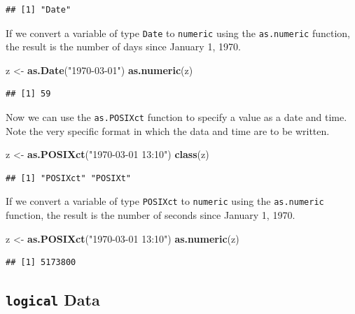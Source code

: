 \documentclass[]{book}
\newenvironment{Shaded}{\begin{snugshade}}{\end{snugshade}}
\newcommand{\KeywordTok}[1]{\textcolor[rgb]{0.13,0.29,0.53}{\textbf{#1}}}
\newcommand{\StringTok}[1]{\textcolor[rgb]{0.31,0.60,0.02}{#1}}
\newcommand{\NormalTok}[1]{#1}
\begin{document}
\begin{verbatim}
## [1] "Date"
\end{verbatim}

If we convert a variable of type \texttt{Date} to \texttt{numeric} using
the \texttt{as.numeric} function, the result is the number of days since
January 1, 1970.

\begin{Shaded}
\begin{Highlighting}[]
\NormalTok{z <-}\StringTok{ }\KeywordTok{as.Date}\NormalTok{(}\StringTok{"1970-03-01"}\NormalTok{)}
\KeywordTok{as.numeric}\NormalTok{(z)}
\end{Highlighting}
\end{Shaded}

\begin{verbatim}
## [1] 59
\end{verbatim}

Now we can use the \texttt{as.POSIXct} function to specify a value as a
date and time. Note the very specific format in which the data and time
are to be written.

\begin{Shaded}
\begin{Highlighting}[]
\NormalTok{z <-}\StringTok{ }\KeywordTok{as.POSIXct}\NormalTok{(}\StringTok{"1970-03-01 13:10"}\NormalTok{)}
\KeywordTok{class}\NormalTok{(z)}
\end{Highlighting}
\end{Shaded}

\begin{verbatim}
## [1] "POSIXct" "POSIXt"
\end{verbatim}

If we convert a variable of type \texttt{POSIXct} to \texttt{numeric}
using the \texttt{as.numeric} function, the result is the number of
seconds since January 1, 1970.

\begin{Shaded}
\begin{Highlighting}[]
\NormalTok{z <-}\StringTok{ }\KeywordTok{as.POSIXct}\NormalTok{(}\StringTok{"1970-03-01 13:10"}\NormalTok{)}
\KeywordTok{as.numeric}\NormalTok{(z)}
\end{Highlighting}
\end{Shaded}

\begin{verbatim}
## [1] 5173800
\end{verbatim}

\subsection{\texorpdfstring{\texttt{logical}
Data}{logical Data}}\label{logical-data}
\end{document}
